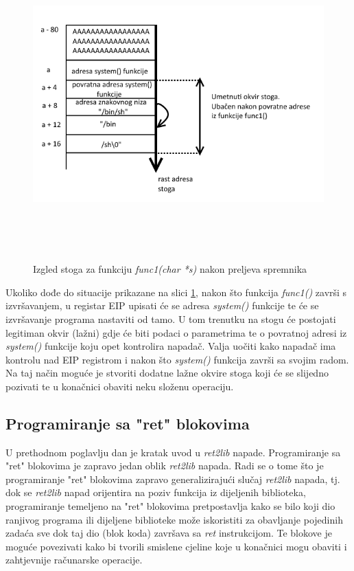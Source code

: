 \documentclass[times, utf8, diplomski, numeric]{fer}
\begin{document}
\begin{figure}[!htb]
\centering
\setlength\fboxsep{0pt}
\setlength\fboxrule{0.5pt}
\includegraphics[width=13cm, height=12cm]{slike/ret2lib}
\caption{Izgled stoga za funkciju \emph{func1(char *s)} nakon preljeva spremnika}
\label{fig:ret2lib} 
\end{figure}

Ukoliko dođe do situacije prikazane na slici \ref{fig:ret2lib},
nakon što funkcija \emph{func1()} završi s izvršavanjem, u
registar EIP upisati će se adresa \emph{system()} funkcije te će
se izvršavanje programa nastaviti od tamo. U tom trenutku na
stogu će postojati legitiman okvir (lažni) gdje će biti podaci o
parametrima te o povratnoj adresi iz \emph{system()} funkcije
koju opet kontrolira napadač. Valja uočiti kako napadač ima
kontrolu nad EIP registrom i nakon što \emph{system()} funkcija
završi sa svojim radom. Na taj način moguće je stvoriti dodatne
lažne okvire stoga koji će se slijedno pozivati te u konačnici
obaviti neku složenu operaciju. 

\subsection{Programiranje sa "ret" blokovima}
\label{sct:rop2}

U prethodnom poglavlju dan je kratak uvod u \emph{ret2lib}
napade. Programiranje sa "ret" blokovima je zapravo jedan oblik
\emph{ret2lib} napada. Radi se o tome što je programiranje "ret"
blokovima zapravo generalizirajući slučaj \emph{ret2lib} napada,
tj. dok se \emph{ret2lib} napad orijentira na poziv funkcija iz
dijeljenih biblioteka, programiranje temeljeno na "ret" blokovima
pretpostavlja kako se bilo koji dio ranjivog programa ili
dijeljene biblioteke može iskoristiti za obavljanje pojedinih
zadaća sve dok taj dio (blok koda) završava sa \emph{ret}
instrukcijom. Te blokove je moguće povezivati kako bi tvorili
smislene cjeline koje u konačnici mogu obaviti i zahtjevnije
računarske operacije.
\end{document}
